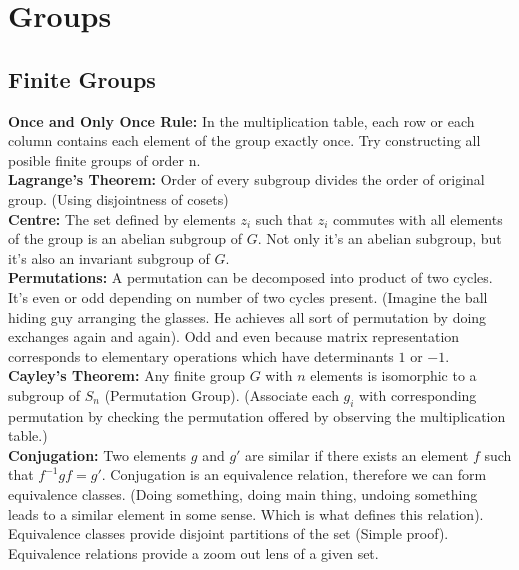 \documentclass{report}
\begin{document}
\chapter{Groups}

\section{Finite Groups}

\noindent\textbf{Once and Only Once Rule:} In the multiplication table, each row or each column contains each element of the group exactly once. Try constructing all posible finite groups of order n.\\

\noindent\textbf{Lagrange's Theorem:} Order of every subgroup divides the order of original group. (Using disjointness of cosets)\\

\noindent\textbf{Centre:} The set defined by elements $z_i$ such that $z_i$ commutes with all elements of the group is an abelian subgroup of $G$. Not only it's an abelian subgroup, but it's also an invariant subgroup of $G$.\\

\noindent\textbf{Permutations:} A permutation can be decomposed into product of two cycles. It's even or odd depending on number of two cycles present. (Imagine the ball hiding guy arranging the glasses. He achieves all sort of permutation by doing exchanges again and again). Odd and even because matrix representation corresponds to elementary operations which have determinants $1$ or $-1$.\\

\noindent\textbf{Cayley's Theorem:} Any finite group $G$ with $n$ elements is isomorphic to a subgroup of $S_n$ (Permutation Group). (Associate each $g_i$ with corresponding permutation by checking the permutation offered by observing the multiplication table.)\\

\noindent\textbf{Conjugation:} Two elements $g$ and $g'$ are similar if there exists an element $f$ such that $f^{-1}gf = g'$. Conjugation is an equivalence relation, therefore we can form equivalence classes. (Doing something, doing main thing, undoing something leads to a similar element in some sense. Which is what defines this relation). Equivalence classes provide disjoint partitions of the set (Simple proof). Equivalence relations provide a zoom out lens of a given set.\\
\end{document}
